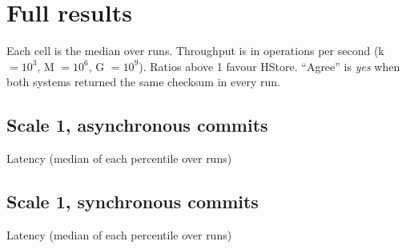\section{Full results}
\label{app:full}

Each cell is the median over runs. Throughput is in operations per second (k $=10^3$, M $=10^6$, G $=10^9$). Ratios above 1 favour HStore. ``Agree'' is \emph{yes} when both systems returned the same checksum in every run.

\subsection{Scale 1, asynchronous commits}

\begin{center}\footnotesize\end{center}

\begin{center}\footnotesize Latency (median of each percentile over runs)\\[2pt]\end{center}

\begin{center}\footnotesize\end{center}

\begin{center}\footnotesize\end{center}

\subsection{Scale 1, synchronous commits}

\begin{center}\footnotesize\end{center}

\begin{center}\footnotesize Latency (median of each percentile over runs)\\[2pt]\end{center}

\begin{center}\footnotesize\end{center}

\begin{center}\footnotesize\end{center}

